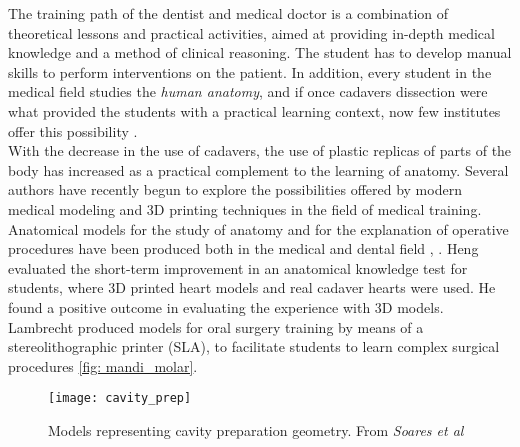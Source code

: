 The training path of the dentist and medical doctor is a combination of theoretical lessons and practical activities, aimed at providing in-depth medical knowledge and a method of clinical reasoning. The student has to develop manual skills to perform interventions on the patient. In addition, every student in the medical field studies the \emph{human anatomy}, and if once cadavers dissection were what provided the students with a practical learning context, now few institutes offer this possibility \parencite{Reference67}. \\
With the decrease in the use of cadavers, the use of plastic replicas of parts of the body has increased as a practical complement to the learning of anatomy. Several authors have recently begun to explore the possibilities offered by modern medical modeling and 3D printing techniques in the field of medical training. \\ Anatomical models for the study of anatomy and for the explanation of operative procedures have been produced both in the medical and dental field \parencite{Reference66 }, \parencite{Reference70}. Heng \parencite{Reference67} evaluated the short-term improvement in an anatomical knowledge test for students, where 3D printed heart models and real cadaver hearts were used. He found a positive outcome in evaluating the experience with 3D models. Lambrecht \parencite{Reference69} produced models for oral surgery training by means of a stereolithographic printer (SLA), to facilitate students to learn complex surgical procedures \ref{fig: mandi_molar}.

\begin{figure}[h]
\vspace{-10pt}
	\begin{center}
	\texttt{[image: cavity\_prep]}
    \caption{Models representing cavity preparation geometry. From \emph{Soares et al} \parencite{Reference71}}
    \label{fig:cavity_prep}
    \end{center}
\vspace{-20pt}
\end{figure}
 
